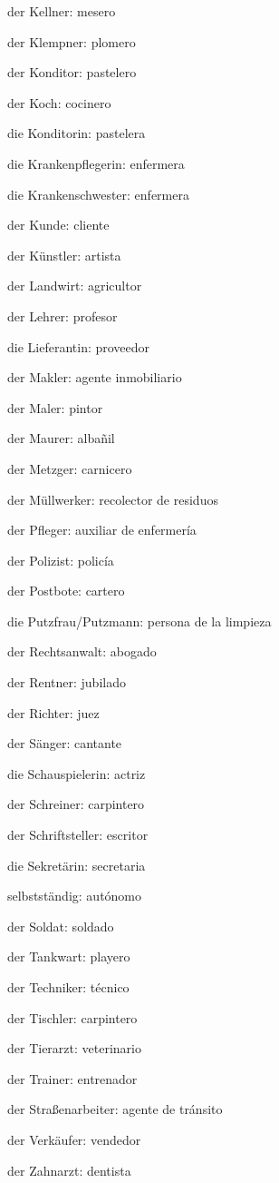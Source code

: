 \begin{multicols}{2}
\begin{myitemize}
\item der Kellner: mesero
\item der Klempner: plomero
\item der Konditor: pastelero
\item der Koch: cocinero
\item die Konditorin: pastelera
\item die Krankenpflegerin: enfermera
\item die Krankenschwester: enfermera
\item der Kunde: cliente
\item der Künstler: artista
\item der Landwirt: agricultor
\item der Lehrer: profesor
\item die Lieferantin: proveedor
\item der Makler: agente inmobiliario
\item der Maler: pintor
\item der Maurer: albañil
\item der Metzger: carnicero
\item der Müllwerker: recolector de residuos
\item der Pfleger: auxiliar de enfermería
\item der Polizist: policía
\item der Postbote: cartero
\item die Putzfrau/Putzmann: persona de la limpieza
\item der Rechtsanwalt: abogado
\item der Rentner: jubilado
\item der Richter: juez
\item der Sänger: cantante
\item die Schauspielerin: actriz
\item der Schreiner: carpintero
\item der Schriftsteller: escritor
\item die Sekretärin: secretaria
\item selbstständig: autónomo
\item der Soldat: soldado
\item der Tankwart: playero
\item der Techniker: técnico
\item der Tischler: carpintero
\item der Tierarzt: veterinario
\item der Trainer: entrenador
\item der Straßenarbeiter: agente de tránsito
\item der Verkäufer: vendedor
\item der Zahnarzt: dentista
\end{myitemize}
\end{multicols}

